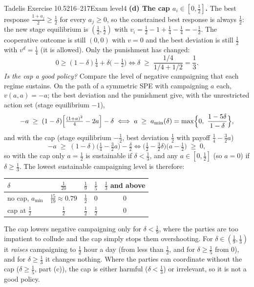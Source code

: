 \begin{exsol}{Tadelis Exercise 10.5}{216--217}{Exam level}{4}
\textbf{(d) The cap $a_i \in [0,\frac12]$.} The best response $\frac{1+a_j}{2} \ge \frac12$ for every $a_j \ge 0$, so
the constrained best response is always $\frac12$: the new stage equilibrium is $(\frac12,\frac12)$ with
$v_i = \frac12 - 1 + \frac14 - \frac14 = -\frac12$. The cooperative outcome is still $(0,0)$ with $v=0$ and the
best deviation is still $\frac12$ with $v^d = \frac14$ (it is allowed). Only the punishment has changed:
\[
  0 \ge (1-\delta)\tfrac14 + \delta\bigl(-\tfrac12\bigr)
  \iff \delta \;\ge\; \frac{1/4}{1/4 + 1/2} = \frac13 .
\]
\emph{Is the cap a good policy?} Compare the level of negative campaigning that each regime sustains. On the
path of a symmetric SPE with campaigning $a$ each, $v(a,a) = -a$; the best deviation and the punishment give, with the
unrestricted action set (stage equilibrium $-1$),
\[
  -a \;\ge\; (1-\delta)\Bigl[\tfrac{(1+a)^2}{4} - 2a\Bigr] - \delta
  \iff a \;\ge\; a_{\min}(\delta) = \max\Bigl\{0,\ \frac{1 - 5\delta}{1 - \delta}\Bigr\},
\]
and with the cap (stage equilibrium $-\frac12$, best deviation $\frac12$ with payoff $\frac14 - \frac32a$)
\[
  -a \;\ge\; (1-\delta)\bigl(\tfrac14 - \tfrac32a\bigr) - \tfrac\delta2
  \iff \bigl(\tfrac12 - \tfrac32\delta\bigr)\bigl(a - \tfrac12\bigr) \;\ge\; 0 ,
\]
so with the cap only $a = \frac12$ is sustainable if $\delta < \frac13$, and any $a \in [0,\frac12]$ (so $a = 0$) if
$\delta \ge \frac13$. The lowest sustainable campaigning level is therefore:
\begin{center}
\begin{tabular}{lcccc}
\toprule
$\delta$ & $\frac1{20}$ & $\frac19$ & $\frac15$ & $\frac13$ and above \\
\midrule
no cap, $a_{\min}$ & $\frac{15}{19}\approx0.79$ & $\frac12$ & $0$ & $0$ \\
cap at $\frac12$ & $\frac12$ & $\frac12$ & $\frac12$ & $0$ \\
\bottomrule
\end{tabular}
\end{center}
The cap lowers negative campaigning only for $\delta < \frac19$, where the parties are too impatient to collude
and the cap simply stops them overshooting. For $\delta \in (\frac19, \frac13)$ it \emph{raises} campaigning to $\frac12$ hour
a day (from less than $\frac12$, and for $\delta \ge \frac15$ from $0$), and for $\delta \ge \frac13$ it changes nothing. Where the parties can coordinate without the cap ($\delta \ge \frac15$, part (c)), the cap is
either harmful ($\delta < \frac13$) or irrelevant, so it is not a good policy.


\end{exsol}
